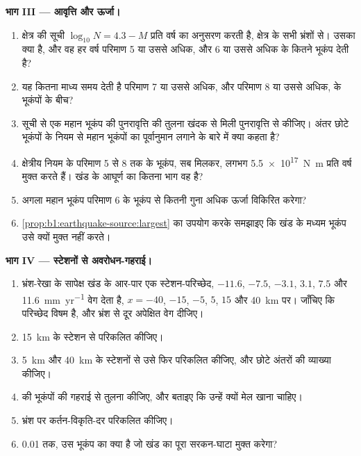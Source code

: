 \begin{problem}
\medskip
\noindent\textbf{भाग III --- आवृत्ति और ऊर्जा।}
\begin{enumerate}[resume]
  \item क्षेत्र की सूची $\log_{10} N = 4.3 - M$ प्रति वर्ष का अनुसरण करती है, क्षेत्र के सभी भ्रंशों से। उसका  क्या है, और वह हर वर्ष परिमाण 5 या उससे अधिक, और 6 या उससे अधिक के कितने भूकंप देती है?
  \item यह कितना माध्य समय देती है परिमाण 7 या उससे अधिक, और परिमाण 8 या उससे अधिक, के भूकंपों के बीच?
  \item सूची से एक महान भूकंप की पुनरावृत्ति की तुलना खंदक से मिली पुनरावृत्ति से कीजिए। अंतर छोटे भूकंपों के नियम से महान भूकंपों का पूर्वानुमान लगाने के बारे में क्या कहता है?
  \item क्षेत्रीय नियम के परिमाण 5 से 8 तक के भूकंप, सब मिलकर, लगभग \qty{5.5e17}{N.m} प्रति वर्ष मुक्त करते हैं। खंड के आघूर्ण का कितना भाग वह है?
  \item अगला महान भूकंप परिमाण 6 के भूकंप से कितनी गुना अधिक ऊर्जा विकिरित करेगा?
  \item \cref{prop:b1:earthquake-source:largest} का उपयोग करके समझाइए कि खंड के मध्यम भूकंप उसे क्यों मुक्त नहीं करते।
\end{enumerate}

\medskip
\noindent\textbf{भाग IV --- स्टेशनों से अवरोधन-गहराई।}
\begin{enumerate}[resume]
  \item भ्रंश-रेखा के सापेक्ष खंड के आर-पार एक स्टेशन-परिच्छेद, $-11.6$, $-7.5$, $-3.1$, $3.1$, $7.5$ और \qty{11.6}{mm.yr^{-1}} वेग देता है, $x = -40$, $-15$, $-5$, $5$, $15$ और \qty{40}{km} पर। जाँचिए कि परिच्छेद विषम है, और भ्रंश से दूर अपेक्षित वेग दीजिए।
  \item \qty{15}{km} के स्टेशन से  परिकलित कीजिए।
  \item \qty{5}{km} और \qty{40}{km} के स्टेशनों से उसे फिर परिकलित कीजिए, और छोटे अंतरों की व्याख्या कीजिए।
  \item {} की भूकंपों की गहराई से तुलना कीजिए, और बताइए कि उन्हें क्यों मेल खाना चाहिए।
  \item भ्रंश पर कर्तन-विकृति-दर परिकलित कीजिए।
  \item 0.01 तक, उस भूकंप का  क्या है जो खंड का पूरा सरकन-घाटा मुक्त करेगा?
\end{enumerate}
\end{problem}
